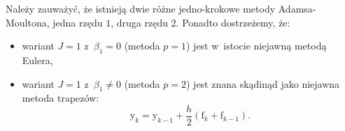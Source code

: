\documentclass[paper=a4,DIV=12]{lpas}
\newcommand{\brm}[1]{\bm{\mathrm{#1}}}
\begin{document}
\begin{appendices}
Należy zauważyć, że istnieją dwie różne jedno-krokowe metody Adamsa-Moultona,
jedna rzędu $1$, druga rzędu $2$. Ponadto dostrzeżemy, że:
\begin{itemize}
  \item wariant $J=1$ z~$\beta_1 = 0$ (metoda $p=1$) jest w~istocie niejawną
        metodą Eulera,
  \item wariant $J=1$ z~$\beta_1 \neq 0$ (metoda $p=2$) jest znana skądinąd jako
        niejawna metoda trapezów:
        \begin{equation}
          \brm{y}_k = \brm{y}_{k-1} + \frac{h}{2} \left(\brm{f}_{k} + \brm{f}_{k-1}\right).
          \label{eq:GY62E}
        \end{equation}
\end{itemize}


\end{appendices}



\end{document}
